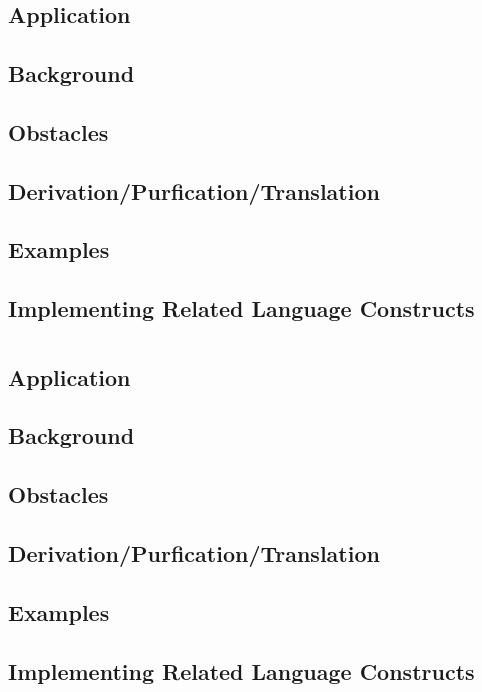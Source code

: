 \chapter{}
\section{Application}
\section{Background}
\section{Obstacles}
\section{Derivation/Purfication/Translation}
\section{Examples}
\section{Implementing Related Language Constructs}

\chapter{}
\section{Application}
\section{Background}
\section{Obstacles}
\section{Derivation/Purfication/Translation}
\section{Examples}
\section{Implementing Related Language Constructs}
